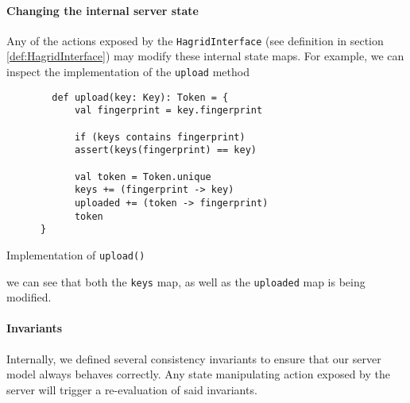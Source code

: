 \paragraph{Changing the internal server state}
Any of the actions exposed by the \texttt{HagridInterface} (see definition in section \ref{def:HagridInterface}) may modify these internal state maps.
For example, we can inspect the implementation of the \texttt{upload} method
\begin{code}
    \begin{verbatim}
        def upload(key: Key): Token = {
            val fingerprint = key.fingerprint
    
            if (keys contains fingerprint)
            assert(keys(fingerprint) == key)
    
            val token = Token.unique
            keys += (fingerprint -> key)
            uploaded += (token -> fingerprint)
            token
      }
    \end{verbatim}
    \caption{Implementation of \texttt{upload()}}
\end{code}

we can see that both the \texttt{keys} map, as well as the \texttt{uploaded} map is being modified.

\paragraph{Invariants} 
Internally, we defined several consistency invariants to ensure that our server model always behaves correctly. 
Any state manipulating action exposed by the server will trigger a re-evaluation of said invariants.

